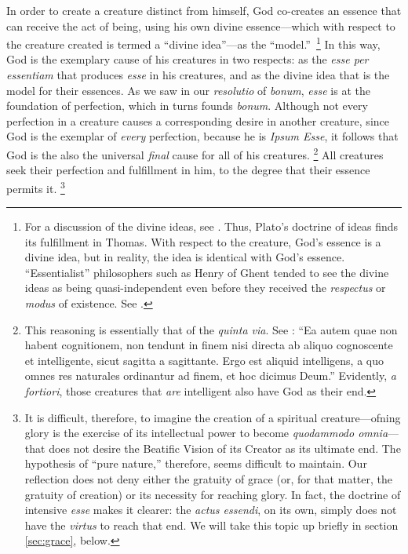 In order to create a creature distinct from himself, God co-creates an essence that can receive the act of being, using his own divine essence---which with respect to the creature created is termed a ``divine idea''---as the ``model.''\,%
%
\footnote{For a discussion of the divine ideas, see \cite[I, q.~15]{st:summa}. Thus, Plato's doctrine of ideas finds its fulfillment in Thomas. With respect to the creature, God's essence is a divine idea, but in reality, the idea is identical with God's essence. ``Essentialist'' philosophers such as Henry of Ghent tended to see the divine ideas as being quasi-independent even before they received the \emph{respectus} or \emph{modus} of existence. See \cite[7]{stanford:henry-of-ghent}.}
%
In this way, God is the exemplary cause of his creatures in two respects: as the \emph{esse per essentiam} that produces \emph{esse} in his creatures, and as the divine idea that is the model for their essences. As we saw in our \emph{resolutio} of \emph{bonum}, \emph{esse} is at the foundation of perfection, which in turns founds \emph{bonum}. Although not every perfection in a creature causes a corresponding desire in another creature, since God is the exemplar of \emph{every} perfection, because he is \emph{Ipsum Esse}, it follows that God is the also the universal \emph{final} cause for all of his creatures.%
%
\footnote{This reasoning is essentially that of the \emph{quinta via}. See \cite[I, q.~2, a.~3, co.]{st:summa}: ``Ea autem quae non habent cognitionem, non tendunt in finem nisi directa ab aliquo cognoscente et intelligente, sicut sagitta a sagittante. Ergo est aliquid intelligens, a quo omnes res naturales ordinantur ad finem, et hoc dicimus Deum.'' Evidently, \emph{a fortiori}, those creatures that \emph{are} intelligent also have God as their end.}
%
All creatures seek their perfection and fulfillment in him, to the degree that their essence permits it.%
%
\footnote{It is difficult, therefore, to imagine the creation of a spiritual creature---ofning glory is the exercise of its intellectual power to become \emph{quodammodo omnia}---that does not desire the Beatific Vision of its Creator as its ultimate end. The hypothesis of ``pure nature,'' therefore, seems difficult to maintain. Our reflection does not deny either the gratuity of grace (or, for that matter, the gratuity of creation) or its necessity for reaching glory. In fact, the doctrine of intensive \emph{esse} makes it clearer: the \emph{actus essendi}, on its own, simply does not have the \emph{virtus} to reach that end. We will take this topic up briefly in section \ref{sec:grace}, below.}
